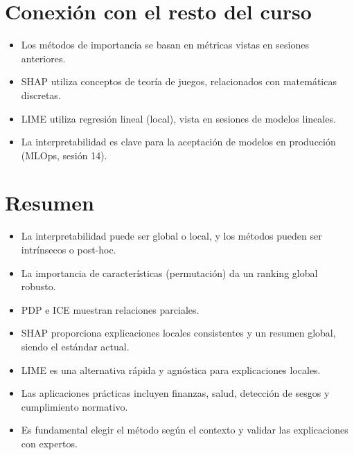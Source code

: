 \documentclass[12pt,a4paper,openany,oneside]{book}
\begin{document}
\section{Conexión con el resto del curso}

\begin{itemize}
    \item Los métodos de importancia se basan en métricas vistas en sesiones anteriores.
    \item SHAP utiliza conceptos de teoría de juegos, relacionados con matemáticas discretas.
    \item LIME utiliza regresión lineal (local), vista en sesiones de modelos lineales.
    \item La interpretabilidad es clave para la aceptación de modelos en producción (MLOps, sesión 14).
\end{itemize}

\section{Resumen}

\begin{itemize}
    \item La interpretabilidad puede ser global o local, y los métodos pueden ser intrínsecos o post-hoc.
    \item La importancia de características (permutación) da un ranking global robusto.
    \item PDP e ICE muestran relaciones parciales.
    \item SHAP proporciona explicaciones locales consistentes y un resumen global, siendo el estándar actual.
    \item LIME es una alternativa rápida y agnóstica para explicaciones locales.
    \item Las aplicaciones prácticas incluyen finanzas, salud, detección de sesgos y cumplimiento normativo.
    \item Es fundamental elegir el método según el contexto y validar las explicaciones con expertos.
\end{itemize}
\end{document}
